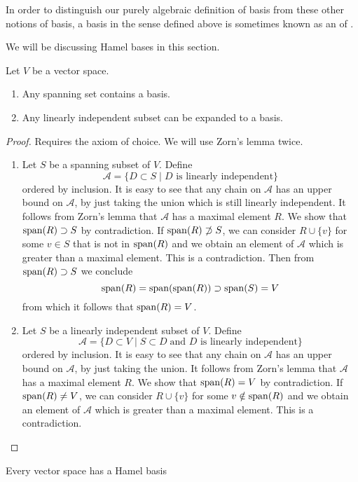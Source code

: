 In order to distinguish our purely algebraic definition of basis from these other notions of basis, a basis in the sense defined above is sometimes known as an  of .

We will be discussing Hamel bases in this section.

\begin{theorem} \label{extensionReductionBasis}
Let $V$ be a vector space.
\begin{enumerate}
\item Any spanning set contains a basis.
\item Any linearly independent subset can be expanded to a basis.
\end{enumerate}
\label{infBasis}
\end{theorem}
\begin{proof}
Requires the axiom of choice. We will use Zorn's lemma twice.
\begin{enumerate}
\item Let $S$ be a spanning subset of $V$. Define
\[ \mathcal{A} = \{ D\subset S \;|\; \text{$D$ is linearly independent}\} \]
ordered by inclusion. It is easy to see that any chain on $\mathcal{A}$ has an upper bound on $\mathcal{A}$, by just taking the union which is still linearly independent. It follows from Zorn's lemma that $\mathcal{A}$ has a maximal element $R$. 
We show that $\operatorname{span}(R) \supset S$ by contradiction. If $\operatorname{span}(R) \not\supset S$, we can consider $R\cup \{v\}$ for some $v \in S$ that is not in $\operatorname{span}(R)$ and we obtain an element of $\mathcal{A}$ which is greater than a maximal element. This is a contradiction. Then from $\operatorname{span}(R) \supset S$ we conclude
\[ \operatorname{span}(R) = \operatorname{span}(\operatorname{span}(R)) \supset \operatorname{span}(S) = V \]
from which it follows that $\operatorname{span}(R) = V$.
\item Let $S$ be a linearly independent subset of $V$. Define
\[ \mathcal{A} = \{ D\subset V \;|\; S \subset D \; \text{and $D$ is linearly independent}\} \]
ordered by inclusion. 
It is easy to see that any chain on $\mathcal{A}$ has an upper bound on $\mathcal{A}$, by just taking the union. It follows from Zorn's lemma that $\mathcal{A}$ has a maximal element $R$. We show that $\operatorname{span}(R) = V$ by contradiction. If $\operatorname{span}(R) \neq V$, we can consider $R\cup \{v\}$ for some $v\notin \operatorname{span}(R)$ and we obtain an element of $\mathcal{A}$ which is greater than a maximal element. This is a contradiction.
\end{enumerate}
\end{proof}
\begin{corollary} \label{existenceHamelBasis}
Every vector space has a Hamel basis
\end{corollary}

